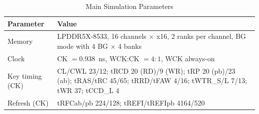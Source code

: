 \begin{table}[!t]
\caption{Main Simulation Parameters}
\label{tab:sim-params}
\centering
\footnotesize
\setlength{\tabcolsep}{3pt}
\begin{tabular}{@{}>{\raggedright\arraybackslash}p{}>{\raggedright\arraybackslash}p{}@{}}
\toprule
\textbf{Parameter} & \textbf{Value} \\
\midrule
Memory & LPDDR5X-8533, 16 channels $\times$ x16, 2 ranks per channel, BG mode with 4 BG $\times$ 4 banks \\
Clock & CK $=0.938$~ns, WCK:CK $=4{:}1$, WCK always-on \\
Key timing (CK) & CL/CWL 23/12; tRCD 20 (RD)/9 (WR); tRP 20 (pb)/23 (ab); tRAS/tRC 45/65; tRRD/tFAW 4/16; tWTR\_S/L 7/13; tWR 37; tCCD\_L 4 \\
Refresh (CK) & tRFCab/pb 224/128; tREFI/tREFIpb 4164/520 \\
\bottomrule
\end{tabular}
\end{table}
